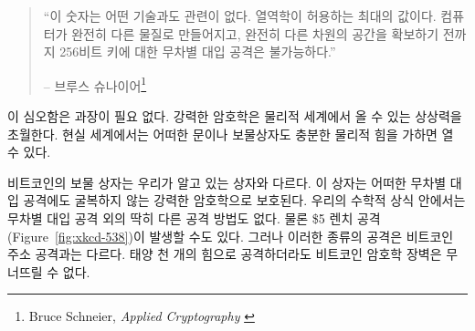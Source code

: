 \begin{comment}
	\begin{quotation}\begin{samepage}
			\enquote{These numbers have nothing to do with the technology of the devices;
				they are the maximums that thermodynamics will allow. And they
				strongly imply that brute-force attacks against 256-bit keys will be
				infeasible until computers are built from something other than matter
				and occupy something other than space.}
			\begin{flushright} -- Bruce Schneier\footnote{Bruce Schneier, \textit{Applied Cryptography} \cite{bruce-schneier}}
	\end{flushright}\end{samepage}\end{quotation}
\end{comment}
\begin{quotation}\begin{samepage}
		\enquote{이 숫자는 어떤 기술과도 관련이 없다. 
			열역학이 허용하는 최대의 값이다.
			컴퓨터가 완전히 다른 물질로 만들어지고, 
			완전히 다른 차원의 공간을 확보하기 전까지 
			256비트 키에 대한 무차별 대입 공격은 불가능하다.}
		\begin{flushright} -- 브루스 슈나이어\footnote{Bruce Schneier, \textit{Applied Cryptography} \cite{bruce-schneier}}
\end{flushright}\end{samepage}\end{quotation}

\begin{comment}
	It is hard to overstate the profoundness of this. Strong cryptography
	inverts the power-balance of the physical world we are so used to.
	Unbreakable things do not exist in the real world. Apply enough force,
	and you will be able to open any door, box, or treasure chest.
\end{comment}
이 심오함은 과장이 필요 없다. 
강력한 암호학은 물리적 세계에서 올 수 있는 상상력을 초월한다.
현실 세계에서는 어떠한 문이나 보물상자도 충분한 물리적 힘을 가하면 열 수 있다.

\begin{comment}
	Bitcoin's treasure chest is very different. It is secured by strong
	cryptography, which does not give way to brute force. And as long as the
	underlying mathematical assumptions hold, brute force is all we have.
	Granted, there is also the option of a global \$5 wrench attack (Figure~\ref{fig:xkcd-538})
	But torture won't work for all bitcoin addresses, and the cryptographic
	walls of bitcoin will defeat brute force attacks. Even if you come at it
	with the force of a thousand suns. Literally.
\end{comment}
비트코인의 보물 상자는 우리가 알고 있는 상자와 다르다. 
이 상자는 어떠한 무차별 대입 공격에도 굴복하지 않는 강력한 암호학으로 보호된다. 
우리의 수학적 상식 안에서는 무차별 대입 공격 외의 딱히 다른 공격 방법도 없다. 
물론 \$5 렌치 공격(Figure~\ref{fig:xkcd-538})이 발생할 수도 있다. 
그러나 이러한 종류의 공격은 비트코인 주소 공격과는 다르다. 
태양 천 개의 힘으로 공격하더라도 비트코인 암호학 장벽은 무너뜨릴 수 없다. 

